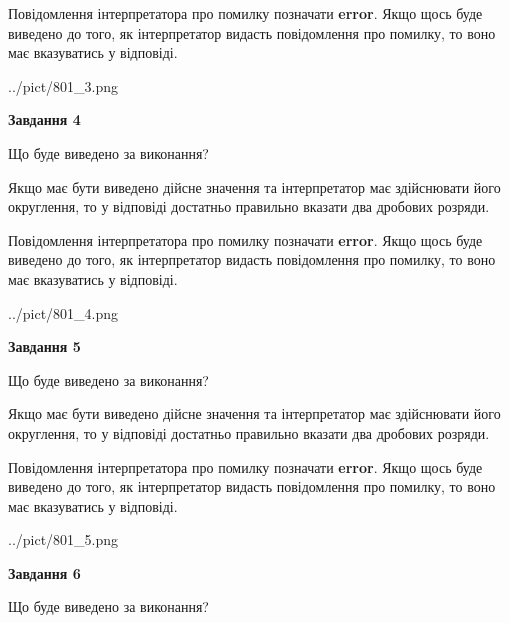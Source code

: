 \documentclass[12pt, ukrainian]{article}
\begin{document}
{\begin {Large}
Повідомлення інтерпретатора про помилку позначати \textbf{error}.
Якщо щось буде виведено до того, як інтерпретатор видасть повідомлення про помилку, 
то воно має вказуватись у відповіді. \par

\begin{center}
	{../pict/801_3.png}
\end{center}
\newpage

{\begin {center}\textbf{Завдання 4}\end {center}}\par
Що буде виведено за виконання? \par

Якщо має бути виведено дійсне значення та інтерпретатор має здійснювати його округлення, 
то у відповіді достатньо правильно вказати два дробових розряди.

Повідомлення інтерпретатора про помилку позначати \textbf{error}.
Якщо щось буде виведено до того, як інтерпретатор видасть повідомлення про помилку, 
то воно має вказуватись у відповіді. \par

\begin{center}
	{../pict/801_4.png}
\end{center}
\newpage

{\begin {center}\textbf{Завдання 5}\end {center}}\par
Що буде виведено за виконання? \par

Якщо має бути виведено дійсне значення та інтерпретатор має здійснювати його округлення, 
то у відповіді достатньо правильно вказати два дробових розряди.

Повідомлення інтерпретатора про помилку позначати \textbf{error}.
Якщо щось буде виведено до того, як інтерпретатор видасть повідомлення про помилку, 
то воно має вказуватись у відповіді. \par

\begin{center}
	{../pict/801_5.png}
\end{center}
\newpage

{\begin {center}\textbf{Завдання 6}\end {center}}\par
Що буде виведено за виконання? \par


\end{Large}}
\end{document}
